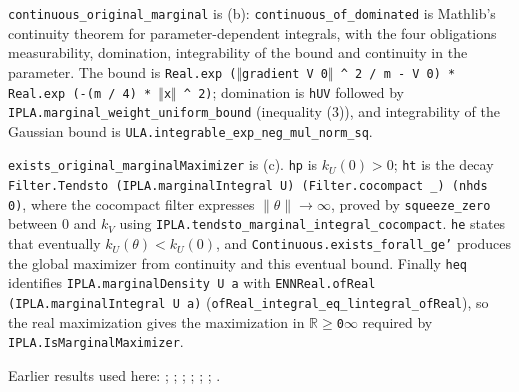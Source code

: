 \documentclass[11pt,a4paper]{report}
\begin{document}
\begin{leanbox}
\texttt{continuous\_\allowbreak{}original\_\allowbreak{}marginal} is (b): \texttt{continuous\_\allowbreak{}of\_\allowbreak{}dominated} is Mathlib's continuity theorem for parameter-dependent integrals, with the four obligations measurability, domination, integrability of the bound and continuity in the parameter. The bound is \texttt{Real.\allowbreak{}exp (\ensuremath{\Vert}gradient V 0\ensuremath{\Vert} \textasciicircum{} 2 /\allowbreak{} m -\allowbreak{} V 0) * Real.\allowbreak{}exp (-\allowbreak{}(m /\allowbreak{} 4) * \ensuremath{\Vert}x\ensuremath{\Vert} \textasciicircum{} 2)}; domination is \texttt{h\allowbreak{}UV} followed by \texttt{IPLA.\allowbreak{}marginal\_\allowbreak{}weight\_\allowbreak{}uniform\_\allowbreak{}bound} (inequality (3)), and integrability of the Gaussian bound is \texttt{ULA.\allowbreak{}integrable\_\allowbreak{}exp\_\allowbreak{}neg\_\allowbreak{}mul\_\allowbreak{}norm\_\allowbreak{}sq}.




\texttt{exists\_\allowbreak{}original\_\allowbreak{}marginal\allowbreak{}Maximizer} is (c). \texttt{hp} is \(k_U(0)>0\); \texttt{ht} is the decay \texttt{Filter.\allowbreak{}Tendsto (IPLA.\allowbreak{}marginal\allowbreak{}Integral U) (Filter.\allowbreak{}cocompact \_\allowbreak{}) (nhds 0)}, where the cocompact filter expresses \(\|\theta\|\to\infty\), proved by \texttt{squeeze\_\allowbreak{}zero} between \(0\) and \(k_V\) using \texttt{IPLA.\allowbreak{}tendsto\_\allowbreak{}marginal\_\allowbreak{}integral\_\allowbreak{}cocompact}. \texttt{he} states that eventually \(k_U(\theta)<k_U(0)\), and \texttt{Continuous.\allowbreak{}exists\_\allowbreak{}forall\_\allowbreak{}ge'} produces the global maximizer from continuity and this eventual bound. Finally \texttt{heq} identifies \texttt{IPLA.\allowbreak{}marginal\allowbreak{}Density U a} with \texttt{ENNReal.\allowbreak{}of\allowbreak{}Real (IPLA.\allowbreak{}marginal\allowbreak{}Integral U a)} (\texttt{of\allowbreak{}Real\_\allowbreak{}integral\_\allowbreak{}eq\_\allowbreak{}lintegral\_\allowbreak{}of\allowbreak{}Real}), so the real maximization gives the maximization in \texttt{\ensuremath{\mathbb R}\ensuremath{\ge}0\ensuremath{\infty}} required by \texttt{IPLA.\allowbreak{}Is\allowbreak{}Marginal\allowbreak{}Maximizer}.
\end{leanbox}


Earlier results used here: \cite[Section~3.26.4]{LangevinLean2026ULASC}; \cite[Section~3.1.1]{LangevinLean2026IPLA}; \cite[Section~3.11.1]{LangevinLean2026IPLA}; \cite[Section~3.12.1]{LangevinLean2026IPLA}; \cite[Section~3.3.1]{LangevinLean2026IPLA}; \cite[Section~3.9.2]{LangevinLean2026IPLA}; \cite[Section~3.9.4]{LangevinLean2026IPLA}.
\end{document}
